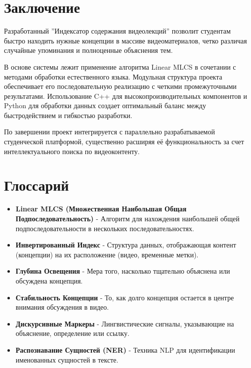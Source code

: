 \documentclass[12pt,a4paper]{article}
\begin{document}
\section{Заключение}

Разработанный ''Индексатор содержания видеолекций'' позволит студентам быстро находить нужные концепции в массиве видеоматериалов, четко различая случайные упоминания и полноценные объяснения тем.

В основе системы лежит применение алгоритма Linear MLCS в сочетании с методами обработки естественного языка. Модульная структура проекта обеспечивает его последовательную реализацию с четкими промежуточными результатами. Использование C++ для высокопроизводительных компонентов и Python для обработки данных создает оптимальный баланс между быстродействием и гибкостью разработки.

По завершении проект интегрируется с параллельно разрабатываемой студенческой платформой, существенно расширяя её функциональность за счет интеллектуального поиска по видеоконтенту.

\appendix
\section{Глоссарий}

\begin{itemize}
    \item \textbf{Linear MLCS (Множественная Наибольшая Общая Подпоследовательность)} - Алгоритм для нахождения наибольшей общей подпоследовательности в нескольких последовательностях.

    \item \textbf{Инвертированный Индекс} - Структура данных, отображающая контент (концепции) на их расположение (видео, временные метки).

    \item \textbf{Глубина Освещения} - Мера того, насколько тщательно объяснена или обсуждена концепция.

    \item \textbf{Стабильность Концепции} - То, как долго концепция остается в центре внимания обсуждения в видео.

    \item \textbf{Дискурсивные Маркеры} - Лингвистические сигналы, указывающие на объяснение, определение или ссылку.

    \item \textbf{Распознавание Сущностей (NER)} - Техника NLP для идентификации именованных сущностей в тексте.
\end{itemize}
\end{document}
